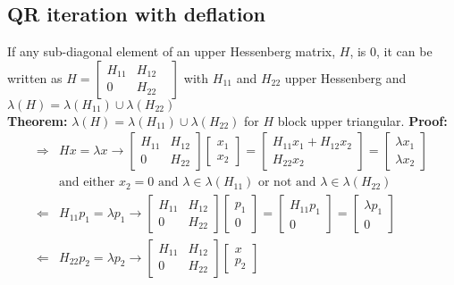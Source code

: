 \documentclass{article}
\begin{document}
\subsection{QR iteration with deflation}
If any sub-diagonal element of an upper Hessenberg matrix, $H$, is 0, it can be written as $H = \begin{bmatrix} H_{11} & H_{12} \\ 0 & H_{22} &\end{bmatrix}$ with $H_{11}$ and $H_{22}$ upper Hessenberg and $\lambda(H) = \lambda(H_{11})\cup \lambda(H_{22})$\\
\textbf{Theorem:} $\lambda(H) = \lambda(H_{11})\cup \lambda(H_{22})$ for $H$ block upper triangular. \textbf{Proof:}
\begin{align*}
    \Longrightarrow& Hx = \lambda x \longrightarrow \begin{bmatrix} H_{11} & H_{12} \\ 0 & H_{22} \end{bmatrix} \begin{bmatrix} x_1 \\ x_2 \end{bmatrix}
     = \begin{bmatrix} H_{11}x_1 + H_{12}x_2 \\ H_{22}x_2 \end{bmatrix} = \begin{bmatrix} \lambda x_1 \\ \lambda x_2 \end{bmatrix}\\
     &\textrm{and either $x_2=0$ and $\lambda \in \lambda(H_{11})$ or not and $\lambda \in \lambda(H_{22})$}\\
     \Longleftarrow& H_{11}p_1 = \lambda p_1 \longrightarrow \begin{bmatrix} H_{11} & H_{12} \\ 0 & H_{22} \end{bmatrix} \begin{bmatrix} p_1 \\ 0 \end{bmatrix}
     = \begin{bmatrix} H_{11}p_1 \\ 0 \end{bmatrix} = \begin{bmatrix} \lambda p_1 \\ 0 \end{bmatrix}\\
     \Longleftarrow& H_{22}p_2 = \lambda p_2 \longrightarrow \begin{bmatrix} H_{11} & H_{12} \\ 0 & H_{22} \end{bmatrix} \begin{bmatrix} x \\ p_2 \end{bmatrix}

\end{align*}
\end{document}
